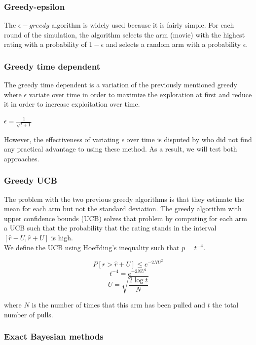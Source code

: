 \documentclass[letterpaper]{article}
\begin{document}
\subsubsection{Greedy-epsilon}

The $\epsilon-greedy$ algorithm is widely used because it is fairly simple. For each round of the simulation, the algorithm selects the arm (movie) with the highest rating with a probability of $1-\epsilon$ and selects a random arm with a probability $\epsilon$.

\subsubsection{Greedy time dependent}

The greedy time dependent is a variation of the previously mentioned greedy where $\epsilon$ variate over time in order to maximize the exploration at first and reduce it in order to increase exploitation over time.

\begin{center}
	$\epsilon = \frac{1}{\sqrt{t+1}}$
\end{center}

However, the effectiveness of variating $\epsilon$ over time is disputed by \cite{vermorel2005multi} who did not find any practical advantage to using these method. As a result, we will test both approaches.

\subsubsection{Greedy UCB}

The problem with the two previous greedy algorithms is that they estimate the mean for each arm but not the standard deviation. The greedy algorithm with upper confidence bounds (UCB) solves that problem by computing for each arm a UCB such that the probability that the rating stands in the interval $[\hat{r}-U, \hat{r}+U]$ is high. \\
We define the UCB using Hoeffding's inequality such that $p = t^{-4}$.

$$ P[r > \hat{r} + U] \leq e^{-2NU^{2}} $$
$$ t^{-4} = e^{-2NU^{2}} $$
$$ U = \sqrt{\frac{2\log{t}}{N}} $$

where $N$ is the number of times that this arm has been pulled and $t$ the total number of pulls.

\subsubsection{Exact Bayesian methods}
\end{document}
